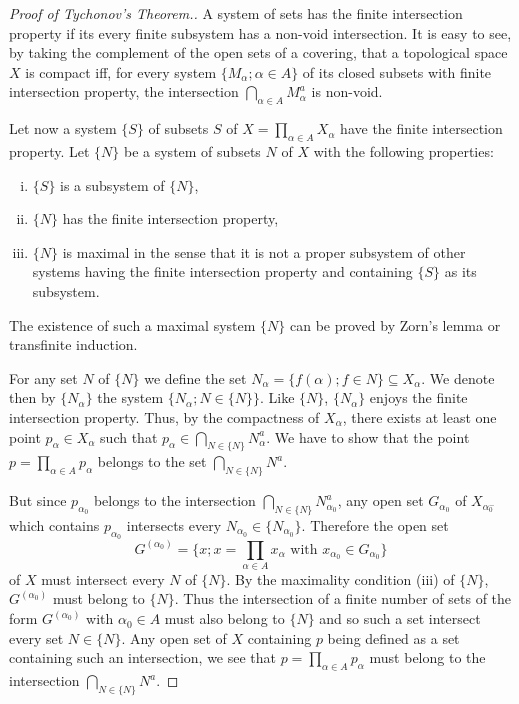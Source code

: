 \begin{proof}[Proof of Tychonov's Theorem.]
A system of sets has the finite intersection property if its every finite subsystem has a non-void intersection. It is easy to see, by taking the complement of the open sets of a covering, that a topological space $X$ is compact iff, for every system $\{M_{\alpha}; \alpha \in A\}$ of its closed subsets with finite intersection property, the intersection $\bigcap\limits_{\alpha \in A} M_{\alpha}^{a}$ is non-void.

Let now a system $\{S\}$ of subsets $S$ of $X = \prod\limits_{\alpha \in A} X_{\alpha}$ have the finite intersection property. Let $\{N\}$ be a system of subsets $N$ of $X$ with the following properties: 

\begin{enumerate}[(i)]
\item $\{S\}$ is a subsystem of $\{N\}$, 

\item $\{N\}$ has the finite intersection property, 

\item $\{N\}$ is maximal in the sense that it is not a proper subsystem of other systems having the finite intersection property and containing $\{S\}$ as its subsystem. 

\end{enumerate}

The existence of such a maximal system $\{N\}$ can be proved by Zorn's lemma or transfinite induction. 

For any set $N$ of $\{N\}$ we define the set $N_{\alpha} = \{f(\alpha); f \in N\} \subseteq X_{\alpha}$. We denote then by $\{N_{\alpha}\}$ the system $\{N_{\alpha}; N \in \{N\}\}$. Like $\{N\}$, $\{N_{\alpha}\}$ enjoys the finite intersection property. Thus, by the compactness of $X_{\alpha}$, there exists at least one point $p_{\alpha} \in X_{\alpha}$ such that $p_{\alpha} \in \bigcap\limits_{N \in \{N\}} N_{\alpha}^{a}$. We have to show that the point $p = \prod\limits_{\alpha \in A} p_{\alpha}$ belongs to the set $\bigcap\limits_{N \in \{N\}} N^{a}$. 

But since $p_{\alpha_0}$ belongs to the intersection $\bigcap\limits_{N \in \{N\}} N_{\alpha_0}^a$, any open set $G_{\alpha_0}$ of $X_{\alpha_0^-}$ which contains $p_{\alpha_0}$ intersects every $N_{\alpha_0} \in \{N_{\alpha_0}\}$. Therefore the open set 
\[
G ^ {(\alpha_{0})} = \{x; x = \prod\limits_{\alpha \in A} x _{\alpha} \text{ with } x _ {\alpha_{0}} \in G _ {\alpha_{0}} \}
\]
of $X$ must intersect every $N$ of $\{N\}$. By the maximality condition (iii) of $\{N\}$, $G^{(\alpha_0)}$ must belong to $\{N\}$. Thus the intersection of a finite number of sets of the form $G^{(\alpha_0)}$ with $\alpha_0 \in A$ must also belong to $\{N\}$ and so such a set intersect every set $N \in \{N\}$. Any open set of $X$ containing $p$ being defined as a set containing such an intersection, we see that $p = \prod\limits_{\alpha \in A} p_\alpha$ must belong to the intersection $\bigcap\limits_{N \in \{N\}} N^a$. 
\end{proof}

